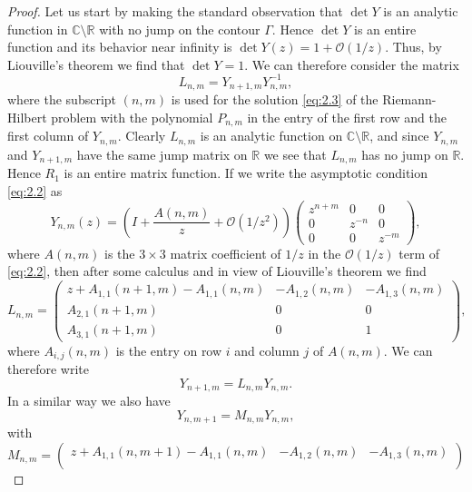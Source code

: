 \documentclass{amsart}
\theoremstyle{remark}
\numberwithin{equation}{section}
\begin{document}
\begin{proof}
Let us start by making the standard observation that $\det Y$ is an analytic function in $\mathbb{C} \setminus \mathbb{R}$
with no jump on the contour $\Gamma$. Hence $\det Y$ is an entire function and its behavior near infinity
is $\det Y(z) = 1 + \mathcal{O}(1/z)$. Thus, by Liouville's theorem we find that $\det Y = 1$.   We can therefore consider
the matrix
\[
L_{n,m} = Y_{n+1,m} Y_{n,m}^{-1},
\]
where the subscript $(n,m)$ is used for the solution \eqref{eq:2.3} of the Riemann-Hilbert problem with
the polynomial $P_{n,m}$ in the entry of the first row and the first column of $Y_{n,m}$.
Clearly $L_{n,m}$ is an analytic function on $\mathbb{C} \setminus \mathbb{R}$, and since $Y_{n,m}$
and $Y_{n+1,m}$ have the same jump matrix on $\mathbb{R}$ we see that $L_{n,m}$ has no jump on $\mathbb{R}$.
Hence $R_1$ is an entire matrix function. If we write the asymptotic condition \eqref{eq:2.2} as
\[    Y_{n,m}(z) = \left( I + \frac{A(n,m)}{z} + \mathcal{O}(1/z^2) \right)
		\begin{pmatrix} z^{n+m} & 0 & 0 \\ 0 & z^{-n} & 0 \\ 0 & 0 & z^{-m} \end{pmatrix}, \]
where $A(n,m)$ is the $3\times 3$ matrix coefficient of $1/z$ in the $\mathcal{O}(1/z)$ term of \eqref{eq:2.2}, then after some calculus
and in view of Liouville's theorem we find
\begin{equation} \label{eq:2.8}
    L_{n,m}  = \begin{pmatrix}
                  z+A_{1,1}(n+1,m)-A_{1,1}(n,m) & -A_{1,2}(n,m) & -A_{1,3}(n,m) \\
                  A_{2,1}(n+1,m) & 0 &  0 \\
                  A_{3,1}(n+1,m) & 0 &  1
                 \end{pmatrix},
\end{equation}
where $A_{i,j}(n,m)$ is the entry on row $i$ and column $j$ of $A(n,m)$.
We can therefore write
\begin{equation} \label{eq:2.9}
      Y_{n+1,m} =L_{n,m}  Y_{n,m}.
\end{equation}
In a similar way we also have
\begin{equation} \label{eq:2.10}
      Y_{n,m+1} = M_{n,m}  Y_{n,m},
\end{equation}
with
\begin{equation} \label{eq:2.11}
    M_{n,m}  = \begin{pmatrix}
                  z+A_{1,1}(n,m+1)-A_{1,1}(n,m) & -A_{1,2}(n,m) & -A_{1,3}(n,m) \\

\end{pmatrix}
\end{equation}
\end{proof}
\end{document}
